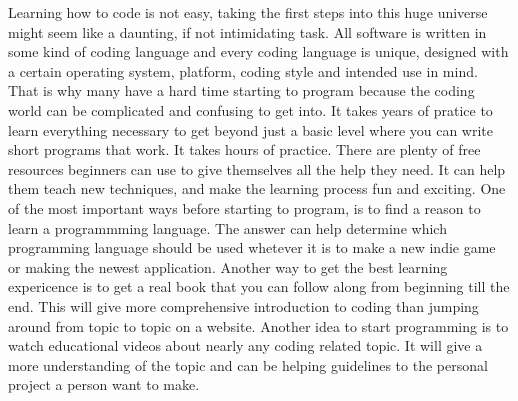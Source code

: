 Learning how to code is not easy, taking the first steps into this huge universe might seem like a daunting, if not intimidating task. All software is written in some kind of coding language and every coding language is unique, designed with a certain operating system, platform, coding style and intended use in mind. 
That is why many have a hard time starting to program because the coding world can be complicated and confusing to get into. It takes years of pratice to learn everything necessary to get beyond just a basic level where you can write short programs that work. It takes hours of practice.
There are plenty of free resources beginners can use to give themselves all the help they need. It can help them teach new techniques, and make the learning process fun and exciting. 
One of the most important ways before starting to program, is to find a reason to learn a programmming language. The answer can help determine which programming language should be used whetever it is to make a new indie game or making the newest application.
Another way to get the best learning expericence is to get a real book that you can follow along from beginning till the end. This will give more comprehensive introduction to coding than jumping around from topic to topic on a website. Another idea to start programming is to watch educational videos about nearly any coding related topic. 
It will give a more understanding of the topic and can be helping guidelines to the personal project a person want to make. 



  

